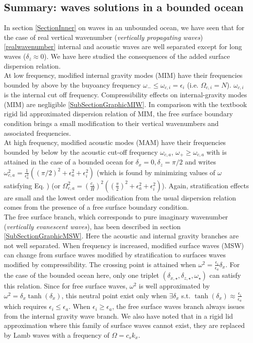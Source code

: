 \subsection{Summary: waves solutions in a bounded ocean}
\label{summarybounded}
In section \ref{SectionInner} on waves in an unbounded ocean,
we have seen that for the case of real vertical wavenumber ({\it vertically propagating waves}) \ref{realwavenumber}
internal and acoustic waves are well separated except for long waves ($\delta_z \approx 0$). We have here studied the consequences of the added surface dispersion relation.\\
At low frequency, modified internal gravity modes (MIM) have their frequencies bounded by above by the buyoancy frequency $\omega_- \le \omega_{c,i} = \epsilon_i$ (i.e. $\Omega_{c,i}=N$). $\omega_{c,i}$ is the internal cut off frequency. Compressibility effects on internal-gravity modes (MIM) are negligible \ref{SubSectionGraphicMIW}. In comparison with the textbook rigid lid approximated dispersion relation of MIM, the free surface boundary condition brings a small modification to their vertical wavenumbers and associated frequencies.\\
At high frequency, modified acoustic modes (MAM) have their frequencies bounded by below by the acoustic cut-off frequency $\omega_{c,a}$, $\omega_+ \ge \omega_{c,a}$ with is attained in the case of a bounded ocean for $\delta_x=0, \delta_z=\pi/2$ and writes $\omega_{c,a}^2=\frac{1}{\epsilon_a^2}\left((\pi/2)^2+\epsilon_a^2+\epsilon_i^2\right)$ (which is found by minimizing values of $\omega$ satisfying Eq. ) (or $\Omega_{c,a}^2=\left(\frac{c_s}{H}\right)^2\left(\left(\frac{\pi}{2}\right)^2+\epsilon_a^2+\epsilon_i^2\right)$). Again, stratification effects are small and the lowest order modification from the usual dispersion relation comes from the presence of a free surface boundary condition.
\\
The free surface branch, which corresponds to pure imaginary wavenumber ({\it vertically evanescent waves}), has been described in section \ref{SubSectionGraphicMSW}. Here the acoustic and internal gravity branches are not well separated. When frequency is increased, modified surface waves (MSW) can change from surface waves modified by stratification to surfaces waves modified by compressibility. The crossing point is attained when $\omega^2=\frac{\epsilon_i}{\epsilon_a}\delta_x$. For the case of the bounded ocean here, only one triplet $\left(\delta_{x,\star}, \delta_{z,\star}, \omega_\star\right)$ can satisfy this relation. Since for free surface waves, $\omega^2$ is well approximated by $\omega^2=\delta_x\tanh(\delta_x)$, this neutral point exist only when $\exists \delta_x$ s.t. $\tanh(\delta_x)\approx \frac{\epsilon_i}{\epsilon_a}$ which requires $\epsilon_i \le \epsilon_a$. When $\epsilon_i \ge \epsilon_a$, the free surface waves branch always issues from the internal gravity wave branch. We also have noted that in a rigid lid approximation where this family of surface waves cannot exist, they are replaced by Lamb waves with a frequency of $\Omega=c_sk_x$.

